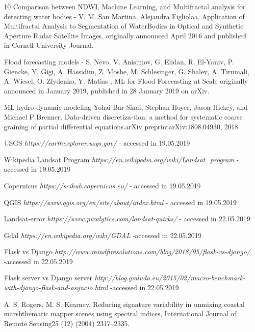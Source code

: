 \documentclass[12pt, a4paper]{report}
\begin{document}
\begin{thebibliography} {10}
Comparison between NDWI, Machine Learning, and Multifractal analysis for detecting water bodies -  
V. M. San Martina, Alejandra Figliolaa, Application of Multifractal Analysis to Segmentation of WaterBodies in Optical and Synthetic Aperture Radar Satellite Images, originally announced April 2016 and published in Cornell University Journal.

Flood forecasting models - S. Nevo, V. Anisimov, G. Elidan, R. El-Yaniv, P. Giencke, Y. Gigi, A. Hassidim, Z. Moshe, M. Schlesinger, G. Shalev, A. Tirumali, A. Wiesel, O. Zlydenko, Y. Matias ,  ML for Flood Forecasting at Scale originally announced in January 2019, published in 28 January 2019 on arXiv.

ML hydro-dynamic modeling
Yohai Bar-Sinai, Stephan Hoyer, Jason Hickey, and Michael P Brenner. Data-driven discretiza-tion: a method for systematic coarse graining of partial differential equations.arXiv preprintarXiv:1808.04930, 2018


USGS \textit{https://earthexplorer.usgs.gov/} - accessed in 19.05.2019


Wikipedia Landsat Program \textit{https://en.wikipedia.org/wiki/Landsat\_program} - accessed in 19.05.2019

Copernicus \textit{https://scihub.copernicus.eu/} - accessed in 19.05.2019

QGIS \textit{https://www.qgis.org/en/site/about/index.html} - accessed in 19.05.2019

Landsat-error \textit{https://www.pixalytics.com/landsat-quirks/} - accessed in 22.05.2019

Gdal \textit{https://en.wikipedia.org/wiki/GDAL} -accessed in 22.05.2019

Flask vs Django \textit{http://www.mindfiresolutions.com/blog/2018/05/flask-vs-django/} -accessed in 22.05.2019

Flask server vs Django server \textit{http://blog.gmludo.eu/2015/02/macro-benchmark-with-django-flask-and-asyncio.html} -accessed in 22.05.2019

A. S. Rogers, M. S. Kearney, Reducing signature variability in unmixing coastal marshthematic mapper scenes using spectral indices, International Journal of Remote Sensing25 (12) (2004) 2317–2335.






\end{thebibliography}






\end{document}
